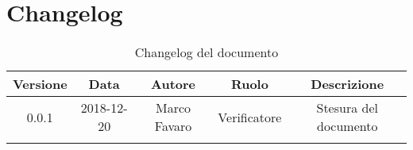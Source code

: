 \newpage

\section{Changelog}

\begin{center}
\begin{longtable}{|c|c|c|c|c|}
\hline
\textbf{Versione} & \textbf{Data} & \textbf{Autore} & \textbf{Ruolo} & \textbf{Descrizione} \\
\hline \hline
\endfirsthead
0.0.1 & 2018-12-20 & Marco Favaro& Verificatore & Stesura del documento \\
\hline
\caption{Changelog del documento}
\end{longtable}
\end{center}
